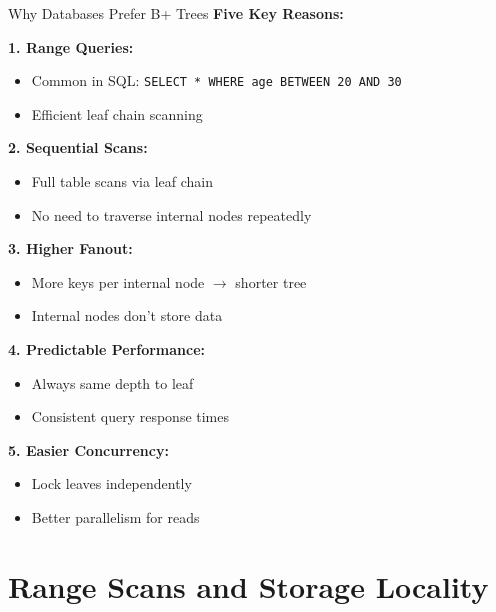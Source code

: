 \documentclass[aspectratio=169]{beamer}
\begin{document}
\begin{frame}{Why Databases Prefer B+ Trees}
  \textbf{Five Key Reasons:}

  \vspace{0.3cm}
  \textbf{1. Range Queries:}
  \begin{itemize}
    \item Common in SQL: \texttt{SELECT * WHERE age BETWEEN 20 AND 30}
    \item Efficient leaf chain scanning
  \end{itemize}

  \textbf{2. Sequential Scans:}
  \begin{itemize}
    \item Full table scans via leaf chain
    \item No need to traverse internal nodes repeatedly
  \end{itemize}

  \textbf{3. Higher Fanout:}
  \begin{itemize}
    \item More keys per internal node $\rightarrow$ shorter tree
    \item Internal nodes don't store data
  \end{itemize}

  \textbf{4. Predictable Performance:}
  \begin{itemize}
    \item Always same depth to leaf
    \item Consistent query response times
  \end{itemize}

  \textbf{5. Easier Concurrency:}
  \begin{itemize}
    \item Lock leaves independently
    \item Better parallelism for reads
  \end{itemize}
\end{frame}

\section{Range Scans and Storage Locality}
\end{document}
